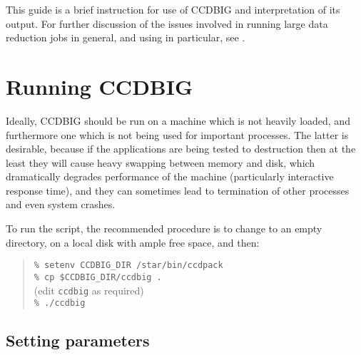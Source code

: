 This guide is a brief instruction for use
of CCDBIG and interpretation of its output.
For further discussion of the issues involved in running large
data reduction jobs in general, and using {\CCDPref} in particular,
see .



\section{Running CCDBIG}

Ideally, CCDBIG should be run on a machine which is not
heavily loaded, and furthermore one which is not being used
for important processes.
The latter is desirable, because if the {\CCDPref} applications
are being tested to destruction then at the least they will
cause heavy swapping between memory and disk, which 
dramatically degrades performance of the machine 
(particularly interactive response time),
and they can sometimes lead to termination of other processes and
even system crashes.

To run the script, the recommended procedure is
to change to an empty directory, on a local disk with 
ample free space, and then:
\begin{quote}
\verb"% setenv CCDBIG_DIR /star/bin/ccdpack" \\
\verb"% cp $CCDBIG_DIR/ccdbig ." \\
\hspace*{3em} (edit {\tt ccdbig} as required) \\
\verb"% ./ccdbig"
\end{quote}


\subsection{Setting parameters}
 \label{sec:parameters}


